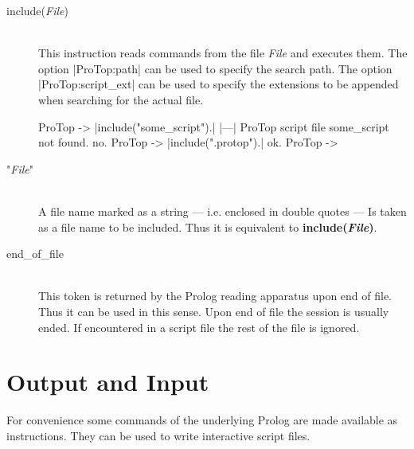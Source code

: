 \begin{description}
  \item [include({\em File})]\ 
    \\
    This instruction reads commands from the file {\em File} and executes
    them.  The option |ProTop:path| can be used to specify the search path.
    The option |ProTop:script\_ext| can be used to specify the extensions to
    be appended when searching for the actual file.
\begin{BoxedSample}
  ProTop -> |include("some_script").|
  |---| ProTop script file some\_script not found.
  no.
  ProTop -> |include(".protop").|
  ok.
  ProTop -> 
\end{BoxedSample}

  \item ["{\em File}"]\ 
    \\
    A file name marked as a string --- i.e. enclosed in double quotes --- Is
    taken as a file name to be included. Thus it is equivalent to
    {\bf include({\em File}\/)}.

  \item [end\_of\_file]\ \\
  This token is returned by the Prolog reading apparatus upon end of file.
  Thus it can be used in this sense. Upon end of file the session is usually
  ended. If encountered in a script file the rest of the file is ignored.
\end{description}

\section{Output and Input}

For convenience some commands of the underlying Prolog are made available as
\ProTop{} instructions. They can be used to write interactive script files.

